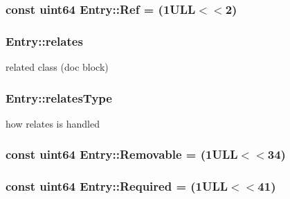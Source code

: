 \subsubsection[{Ref}]{\setlength{\rightskip}{0pt plus 5cm}const {\bf uint64} Entry\+::\+Ref = (1\+U\+L\+L$<$$<$2)\hspace{0.3cm}{\ttfamily [static]}}\label{class_entry_a530abd3056891add4d91ef6b26a55ca1}
\hypertarget{class_entry_a611ec017dea1768b7093bea6e4177cba}{}
\subsubsection[{relates}]{ Entry\+::relates}\label{class_entry_a611ec017dea1768b7093bea6e4177cba}


related class (doc block) 

\hypertarget{class_entry_a74ff1e30a3ed19f82ce61f70b8a5a413}{}
\subsubsection[{relates\+Type}]{ Entry\+::relates\+Type}\label{class_entry_a74ff1e30a3ed19f82ce61f70b8a5a413}


how relates is handled 

\hypertarget{class_entry_a8776cd2246f045bb3babf98767059b01}{}
\subsubsection[{Removable}]{\setlength{\rightskip}{0pt plus 5cm}const {\bf uint64} Entry\+::\+Removable = (1\+U\+L\+L$<$$<$34)\hspace{0.3cm}{\ttfamily [static]}}\label{class_entry_a8776cd2246f045bb3babf98767059b01}
\hypertarget{class_entry_a8f112187a1d23bcc9a76e24ce8cb995f}{}
\subsubsection[{Required}]{\setlength{\rightskip}{0pt plus 5cm}const {\bf uint64} Entry\+::\+Required = (1\+U\+L\+L$<$$<$41)\hspace{0.3cm}{\ttfamily [static]}}\label{class_entry_a8f112187a1d23bcc9a76e24ce8cb995f}
\hypertarget{class_entry_a4e58873aeb4db094eca72da7444161e9}{}
